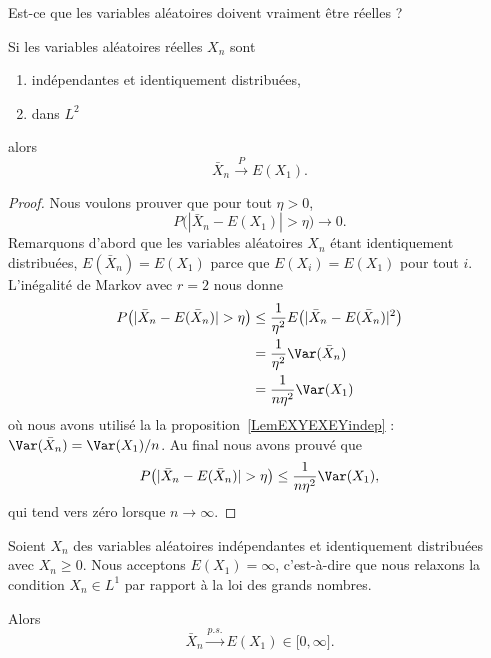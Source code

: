 \begin{probleme}
	Est-ce que les variables aléatoires doivent vraiment être réelles ?
\end{probleme}

\begin{corollary}		\label{CORooAYTPooMdAdoN}
	Si les variables aléatoires réelles \( X_n\) sont
	\begin{enumerate}
		\item
		      indépendantes et identiquement distribuées,
		\item
		      dans \( L^2\)
	\end{enumerate}
	alors
	\begin{equation}
		\bar X_n\stackrel{P}{\longrightarrow}E(X_1).
	\end{equation}
\end{corollary}

\begin{proof}
	Nous voulons prouver que pour tout \( \eta>0\),
	\begin{equation}
		P\big( | \bar X_n-E(X_1) |>\eta \big)\to 0.
	\end{equation}
	Remarquons d'abord que les variables aléatoires \( X_n\) étant identiquement distribuées, \( E(\bar X_n)=E(X_1)\) parce que \( E(X_i)=E(X_1)\) pour tout \( i\). L'inégalité de Markov avec \( r=2\) nous donne
	\begin{subequations}
		\begin{align}
			P\big( | \bar X_n-E(\bar X_n) |  >\eta \big) & \leq\frac{1}{ \eta^2 }E\big( | \bar X_n-E(\bar X_n) |^2 \big) \\
			                                             & =\frac{1}{ \eta^2 } \Var(\bar X_n)                            \\
			                                             & = \frac{1}{ n\eta^2 }\Var(X_1)
		\end{align}
	\end{subequations}
	où nous avons utilisé la la proposition~\ref{LemEXYEXEYindep} : \( \Var(\bar X_n)=\Var(X_1)/n\). Au final nous avons prouvé que
	\begin{equation}
		P\big( | \bar X_n-E(\bar X_n) |>\eta\big)\leq\frac{1}{ n\eta^2 }\Var(X_1),
	\end{equation}
	qui tend vers zéro lorsque \( n\to\infty\).
\end{proof}

\begin{proposition}
	Soient \( X_n\) des variables aléatoires indépendantes et identiquement distribuées avec \( X_n\geq 0\). Nous acceptons \( E(X_1)=\infty\), c'est-à-dire que nous relaxons la condition \( X_n\in L^1\) par rapport à la loi des grands nombres.

	Alors
	\begin{equation}
		\bar X_n\stackrel{p.s.}{\longrightarrow} E(X_1)\in\mathopen[ 0 , \infty \mathclose].
	\end{equation}
\end{proposition}

